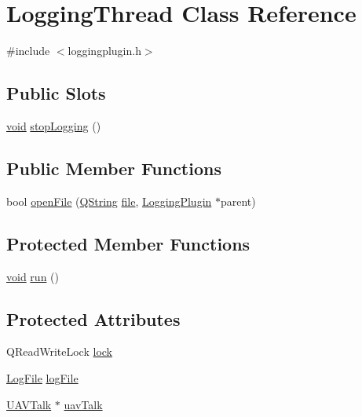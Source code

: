 \hypertarget{class_logging_thread}{\section{\-Logging\-Thread \-Class \-Reference}
\label{class_logging_thread}
}


{\ttfamily \#include $<$loggingplugin.\-h$>$}

\subsection*{\-Public \-Slots}
\begin{DoxyCompactItemize}
\item 
\hyperlink{group___u_a_v_objects_plugin_ga444cf2ff3f0ecbe028adce838d373f5c}{void} \hyperlink{group___logging_ga5eba425f2187c79f32c9a7b8187c4de4}{stop\-Logging} ()
\end{DoxyCompactItemize}
\subsection*{\-Public \-Member \-Functions}
\begin{DoxyCompactItemize}
\item 
bool \hyperlink{group___logging_gabd55e7242d33b800b73a8ff3fc56deb5}{open\-File} (\hyperlink{group___u_a_v_objects_plugin_gab9d252f49c333c94a72f97ce3105a32d}{\-Q\-String} \hyperlink{uavobjecttemplate_8m_a97c04efa65bcf0928abf9260bc5cbf46}{file}, \hyperlink{class_logging_plugin}{\-Logging\-Plugin} $\ast$parent)
\end{DoxyCompactItemize}
\subsection*{\-Protected \-Member \-Functions}
\begin{DoxyCompactItemize}
\item 
\hyperlink{group___u_a_v_objects_plugin_ga444cf2ff3f0ecbe028adce838d373f5c}{void} \hyperlink{group___logging_ga1efde5dc8009a1f63a5ab9a52f9c3749}{run} ()
\end{DoxyCompactItemize}
\subsection*{\-Protected \-Attributes}
\begin{DoxyCompactItemize}
\item 
\-Q\-Read\-Write\-Lock \hyperlink{class_logging_thread_a1785d83bc4ce0953c423e8ac27d7cebb}{lock}
\item 
\hyperlink{class_log_file}{\-Log\-File} \hyperlink{class_logging_thread_ab940b3322d9c974b3d3630b9509ef4bb}{log\-File}
\item 
\hyperlink{class_u_a_v_talk}{\-U\-A\-V\-Talk} $\ast$ \hyperlink{class_logging_thread_a0dfed803383ab861a16c748421396306}{uav\-Talk}
\end{DoxyCompactItemize}


